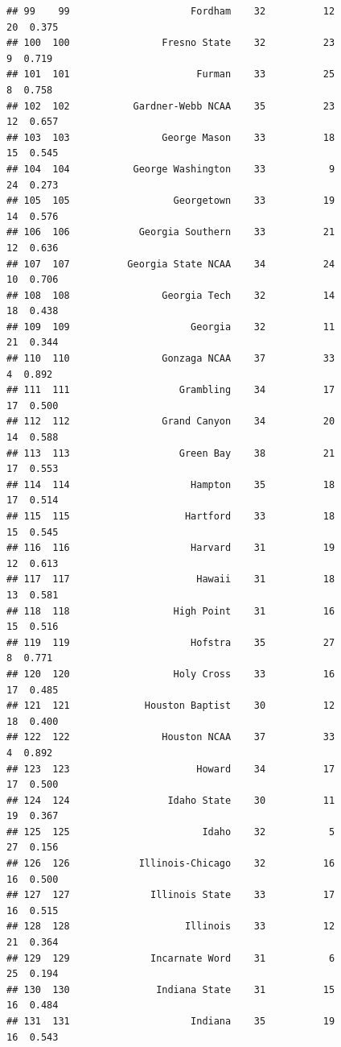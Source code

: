 \documentclass[]{book}
\begin{document}
\begin{verbatim}
## 99    99                     Fordham    32          12            20  0.375
## 100  100                Fresno State    32          23             9  0.719
## 101  101                      Furman    33          25             8  0.758
## 102  102           Gardner-Webb NCAA    35          23            12  0.657
## 103  103                George Mason    33          18            15  0.545
## 104  104           George Washington    33           9            24  0.273
## 105  105                  Georgetown    33          19            14  0.576
## 106  106            Georgia Southern    33          21            12  0.636
## 107  107          Georgia State NCAA    34          24            10  0.706
## 108  108                Georgia Tech    32          14            18  0.438
## 109  109                     Georgia    32          11            21  0.344
## 110  110                Gonzaga NCAA    37          33             4  0.892
## 111  111                   Grambling    34          17            17  0.500
## 112  112                Grand Canyon    34          20            14  0.588
## 113  113                   Green Bay    38          21            17  0.553
## 114  114                     Hampton    35          18            17  0.514
## 115  115                    Hartford    33          18            15  0.545
## 116  116                     Harvard    31          19            12  0.613
## 117  117                      Hawaii    31          18            13  0.581
## 118  118                  High Point    31          16            15  0.516
## 119  119                     Hofstra    35          27             8  0.771
## 120  120                  Holy Cross    33          16            17  0.485
## 121  121             Houston Baptist    30          12            18  0.400
## 122  122                Houston NCAA    37          33             4  0.892
## 123  123                      Howard    34          17            17  0.500
## 124  124                 Idaho State    30          11            19  0.367
## 125  125                       Idaho    32           5            27  0.156
## 126  126            Illinois-Chicago    32          16            16  0.500
## 127  127              Illinois State    33          17            16  0.515
## 128  128                    Illinois    33          12            21  0.364
## 129  129              Incarnate Word    31           6            25  0.194
## 130  130               Indiana State    31          15            16  0.484
## 131  131                     Indiana    35          19            16  0.543

\end{verbatim}
\end{document}
